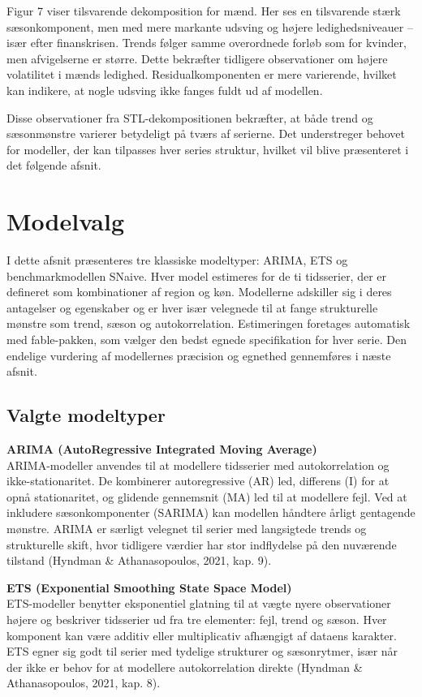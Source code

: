 \documentclass[
]{article}
\begin{document}
Figur 7 viser tilsvarende dekomposition for mænd. Her ses en tilsvarende
stærk sæsonkomponent, men med mere markante udsving og højere
ledighedsniveauer -- især efter finanskrisen. Trends følger samme
overordnede forløb som for kvinder, men afvigelserne er større. Dette
bekræfter tidligere observationer om højere volatilitet i mænds
ledighed. Residualkomponenten er mere varierende, hvilket kan indikere,
at nogle udsving ikke fanges fuldt ud af modellen.

Disse observationer fra STL-dekompositionen bekræfter, at både trend og
sæsonmønstre varierer betydeligt på tværs af serierne. Det understreger
behovet for modeller, der kan tilpasses hver series struktur, hvilket
vil blive præsenteret i det følgende afsnit.

\section{Modelvalg}\label{modelvalg}

I dette afsnit præsenteres tre klassiske modeltyper: ARIMA, ETS og
benchmarkmodellen SNaive. Hver model estimeres for de ti tidsserier, der
er defineret som kombinationer af region og køn. Modellerne adskiller
sig i deres antagelser og egenskaber og er hver især velegnede til at
fange strukturelle mønstre som trend, sæson og autokorrelation.
Estimeringen foretages automatisk med fable-pakken, som vælger den bedst
egnede specifikation for hver serie. Den endelige vurdering af
modellernes præcision og egnethed gennemføres i næste afsnit.

\subsection{Valgte modeltyper}\label{valgte-modeltyper}

\textbf{ARIMA (AutoRegressive Integrated Moving Average)}\\
ARIMA-modeller anvendes til at modellere tidsserier med autokorrelation
og ikke-stationaritet. De kombinerer autoregressive (AR) led, differens
(I) for at opnå stationaritet, og glidende gennemsnit (MA) led til at
modellere fejl. Ved at inkludere sæsonkomponenter (SARIMA) kan modellen
håndtere årligt gentagende mønstre. ARIMA er særligt velegnet til serier
med langsigtede trends og strukturelle skift, hvor tidligere værdier har
stor indflydelse på den nuværende tilstand (Hyndman \& Athanasopoulos,
2021, kap. 9).

\textbf{ETS (Exponential Smoothing State Space Model)}\\
ETS-modeller benytter eksponentiel glatning til at vægte nyere
observationer højere og beskriver tidsserier ud fra tre elementer: fejl,
trend og sæson. Hver komponent kan være additiv eller multiplicativ
afhængigt af dataens karakter. ETS egner sig godt til serier med
tydelige strukturer og sæsonrytmer, især når der ikke er behov for at
modellere autokorrelation direkte (Hyndman \& Athanasopoulos, 2021, kap.
8).
\end{document}

